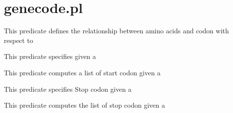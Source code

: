 


\section{genecode.pl}

\label{sec:genecode}

\begin{description}
This predicate defines the relationship between amino acids and codon with respect
to 

This predicate specifies  given a 

This predicate computes a list of start codon given a 

This predicate specifies Stop codon given a 

This predicate computes the list of stop codon given a 
\end{description}

